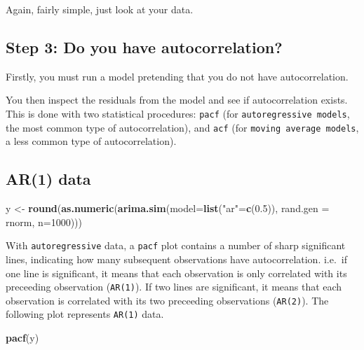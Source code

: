 \documentclass[]{book}
\newenvironment{Shaded}{\begin{snugshade}}{\end{snugshade}}
\newcommand{\KeywordTok}[1]{\textcolor[rgb]{0.13,0.29,0.53}{\textbf{#1}}}
\newcommand{\DataTypeTok}[1]{\textcolor[rgb]{0.13,0.29,0.53}{#1}}
\newcommand{\DecValTok}[1]{\textcolor[rgb]{0.00,0.00,0.81}{#1}}
\newcommand{\FloatTok}[1]{\textcolor[rgb]{0.00,0.00,0.81}{#1}}
\newcommand{\StringTok}[1]{\textcolor[rgb]{0.31,0.60,0.02}{#1}}
\newcommand{\NormalTok}[1]{#1}
\begin{document}
Again, fairly simple, just look at your data.

\subsection{Step 3: Do you have
autocorrelation?}\label{step-3-do-you-have-autocorrelation}

Firstly, you must run a model pretending that you do not have
autocorrelation.

You then inspect the residuals from the model and see if autocorrelation
exists. This is done with two statistical procedures: \texttt{pacf} (for
\texttt{autoregressive\ models}, the most common type of
autocorrelation), and \texttt{acf} (for
\texttt{moving\ average\ models}, a less common type of
autocorrelation).

\newpage 

\subsection{AR(1) data}\label{ar1-data}

\begin{Shaded}
\begin{Highlighting}[]
\NormalTok{y <-}\StringTok{ }\KeywordTok{round}\NormalTok{(}\KeywordTok{as.numeric}\NormalTok{(}\KeywordTok{arima.sim}\NormalTok{(}\DataTypeTok{model=}\KeywordTok{list}\NormalTok{(}\StringTok{"ar"}\NormalTok{=}\KeywordTok{c}\NormalTok{(}\FloatTok{0.5}\NormalTok{)), }\DataTypeTok{rand.gen =}\NormalTok{ rnorm, }\DataTypeTok{n=}\DecValTok{1000}\NormalTok{)))}
\end{Highlighting}
\end{Shaded}

With \texttt{autoregressive} data, a \texttt{pacf} plot contains a
number of sharp significant lines, indicating how many subsequent
observations have autocorrelation. i.e.~if one line is significant, it
means that each observation is only correlated with its preceeding
observation (\texttt{AR(1)}). If two lines are significant, it means
that each observation is correlated with its two preceeding observations
(\texttt{AR(2)}). The following plot represents \texttt{AR(1)} data.

\begin{Shaded}
\begin{Highlighting}[]
\KeywordTok{pacf}\NormalTok{(y)}
\end{Highlighting}
\end{Shaded}
\end{document}

